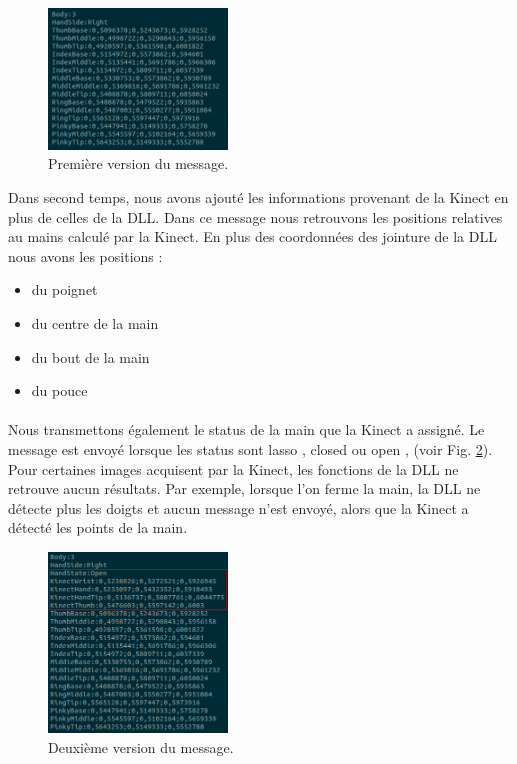 \begin{figure}[H]
  \label{fig:socketv1}
  \begin{center}
    \includegraphics[width=180px]{images/socket_v1.png}
    \caption{Première version du message.}
  \end{center}
\end{figure}

Dans second temps, nous avons ajouté les informations provenant de la 
Kinect en plus de celles de la DLL. Dans ce message nous retrouvons 
les positions relatives au mains calculé par la Kinect. En plus des 
coordonnées des jointure de la DLL nous avons les positions :\\
\begin{itemize}
  \item du poignet
  \item du centre de la main
  \item du bout de la main
  \item du pouce
\end{itemize}
\paragraph{}
Nous transmettons également le status de la main que la Kinect a 
assigné. Le message est envoyé lorsque les status sont \og lasso \fg, \og closed \fg ou 
\og open \fg, (voir Fig. \ref{fig:socketv2}). Pour certaines images 
acquisent par la Kinect, les fonctions de la DLL ne retrouve aucun 
résultats. Par exemple, lorsque l'on ferme la main, la DLL ne détecte 
plus les doigts et aucun message n'est envoyé, alors que la Kinect a 
détecté les points de la main.

\begin{figure}[H]
  \label{fig:socketv2}
  \begin{center}
    \includegraphics[width=180px]{images/socket_v2.png}
    \caption{Deuxième version du message.}
  \end{center}
\end{figure}

